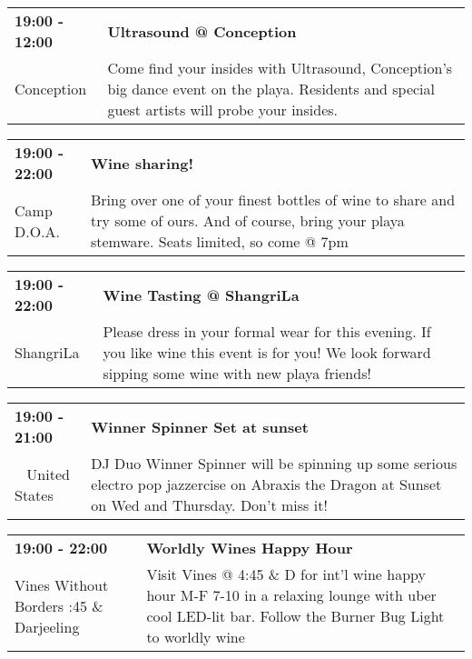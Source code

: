 \begin{tabular}{ p{1in} p{2.2in} }
    \textbf{19:00 - 12:00} & \textbf{Ultrasound @ Conception} \\
    Conception \newline  & Come find your insides with Ultrasound, Conception's big dance event on the playa. Residents and special guest artists will probe your insides. \\
    \hline 
\end{tabular}
    
\begin{tabular}{ p{1in} p{2.2in} }
    \textbf{19:00 - 22:00} & \textbf{Wine sharing!} \\
    Camp D.O.A. \newline  & Bring over one of your finest bottles of wine to share and try some of ours. And of course, bring your playa stemware. Seats limited, so come @ 7pm \\
    \hline 
\end{tabular}
    
\begin{tabular}{ p{1in} p{2.2in} }
    \textbf{19:00 - 22:00} & \textbf{Wine Tasting @ ShangriLa} \\
    ShangriLa \newline  & Please dress in your formal wear for this evening. If you like wine this event is for you! We look forward sipping some wine with new playa friends! \\
    \hline 
\end{tabular}
    
\begin{tabular}{ p{1in} p{2.2in} }
    \textbf{19:00 - 21:00} & \textbf{Winner Spinner Set at sunset } \\
    ~ \newline United States & DJ Duo Winner Spinner will be spinning up some serious electro pop jazzercise on Abraxis the Dragon at Sunset on Wed and Thursday. Don't miss it! \\
    \hline 
\end{tabular}
    
\begin{tabular}{ p{1in} p{2.2in} }
    \textbf{19:00 - 22:00} & \textbf{Worldly Wines Happy Hour} \\
    Vines Without Borders \newline 4:45 \& Darjeeling & Visit Vines @ 4:45 \& D for int'l wine happy hour M-F 7-10 in a relaxing lounge with uber cool LED-lit bar. Follow the Burner Bug Light to worldly wine \\
    \hline 
\end{tabular}
    
